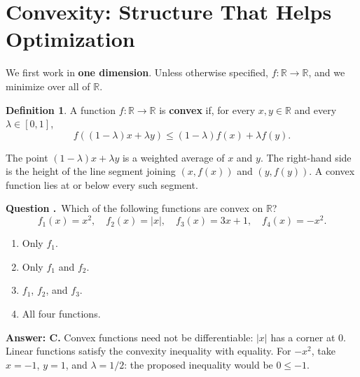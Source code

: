 \documentclass[11pt,letterpaper]{article}
\newif\ifstudentversion
\newcommand{\hide}[1]{%
  \ifstudentversion
    \ifmmode\phantom{#1}\else\underline{\phantom{#1}}\fi
  \else #1\fi}
\theoremstyle{definition}
\newtheorem{definition}{Definition}
\theoremstyle{plain}
\newcounter{question}
\newenvironment{Qu}{%
  \par\medskip\refstepcounter{question}
  \noindent\textbf{Question \thequestion.}\ }{\par\medskip}
\newcommand{\QU}{\begin{Qu}}
\newcommand{\aitem}{\item[\textbf{(A)}]}
\newcommand{\bitem}{\item[\textbf{(B)}]}
\newcommand{\citem}{\item[\textbf{(C)}]}
\newcommand{\ditem}{\item[\textbf{(D)}]}
\newcommand{\R}{\mathbb R}
\begin{document}
\newpage
\section{Convexity: Structure That Helps Optimization}

We first work in \textbf{one dimension}. Unless otherwise specified,
$f:\R\to\R$, and we minimize over all of $\R$.

\begin{definition}
A function $f:\R\to\R$ is \hide{\textbf{convex}} if, for every $x,y\in\R$
and every $\lambda\in[0,1]$,
\[
  \boxed{f((1-\lambda)x+\lambda y)
  \leq (1-\lambda)f(x)+\lambda f(y).}
\]
\end{definition}

The point $(1-\lambda)x+\lambda y$ is a weighted average of $x$ and $y$.
The right-hand side is the height of the line segment joining
$(x,f(x))$ and $(y,f(y))$. A convex function lies \hide{at or below}
every such segment.

\begin{center}
\end{center}

\QU Which of the following functions are convex on $\R$?
\[
  f_1(x)=x^2,\quad f_2(x)=|x|,\quad
  f_3(x)=3x+1,\quad f_4(x)=-x^2.
\]
\begin{enumerate}
  \aitem Only $f_1$.
  \bitem Only $f_1$ and $f_2$.
  \citem $f_1$, $f_2$, and $f_3$.
  \ditem All four functions.
\end{enumerate}
\end{Qu}
\begin{answer}
\textbf{Answer: C.} Convex functions need not be differentiable: $|x|$ has a
corner at $0$. Linear functions satisfy the convexity inequality with
equality. For $-x^2$, take $x=-1$, $y=1$, and $\lambda=1/2$:
the proposed inequality would be $0\leq-1$.
\end{answer}
\end{document}
